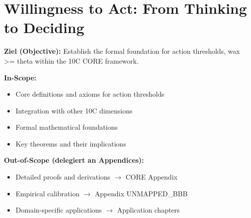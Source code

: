 %
%
%
%
%

\chapter{Willingness to Act: From Thinking to Deciding}
\label{ch:willingness}

\begin{tcolorbox}[
    colback=purple!5!white,
    colframe=purple!75!black,
    title={\textbf{Chapter Scope: Ziel / In-Scope / Out-of-Scope}},
    fonttitle=\bfseries
]

\textbf{Ziel (Objective):}
Establish the formal foundation for action thresholds, wax >= theta within the 10C CORE framework.

\vspace{0.3cm}
\textbf{In-Scope:}
\begin{itemize}[nosep]
    \item Core definitions and axioms for action thresholds
    \item Integration with other 10C dimensions
    \item Formal mathematical foundations
    \item Key theorems and their implications
\end{itemize}

\vspace{0.3cm}
\textbf{Out-of-Scope (delegiert an Appendices):}
\begin{itemize}[nosep]
    \item Detailed proofs and derivations $\rightarrow$ CORE Appendix
    \item Empirical calibration $\rightarrow$ Appendix UNMAPPED_BBB
    \item Domain-specific applications $\rightarrow$ Application chapters
\end{itemize}

\end{tcolorbox}



